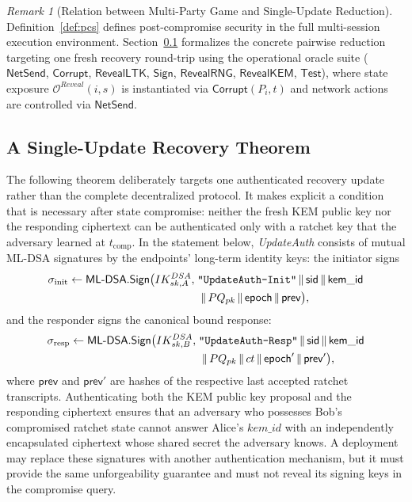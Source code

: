 \documentclass[11pt,a4paper]{article}
\theoremstyle{remark}
\newtheorem{remark}[theorem]{Remark}
\theoremstyle{plain}
\newcommand{\calO}{\mathcal{O}}
\newcommand{\MLDSA}{\mathsf{ML\text{-}DSA}}
\newcommand{\Sign}{\mathsf{Sign}}
\newcommand{\strlit}[1]{\text{\upshape\texttt{"#1"}}}
\begin{document}
\begin{remark}[Relation between Multi-Party Game and Single-Update Reduction]
Definition~\ref{def:pcs} defines post-compromise security in the full multi-session execution environment.  Section~\ref{sec:single-update-theorem} formalizes the concrete pairwise reduction targeting one fresh recovery round-trip using the operational oracle suite ($\mathsf{NetSend}$, $\mathsf{Corrupt}$, $\mathsf{RevealLTK}$, $\mathsf{Sign}$, $\mathsf{RevealRNG}$, $\mathsf{RevealKEM}$, $\mathsf{Test}$), where state exposure $\calO^{Reveal}(i, s)$ is instantiated via $\mathsf{Corrupt}(P_i, t)$ and network actions are controlled via $\mathsf{NetSend}$.
\end{remark}

\subsection{A Single-Update Recovery Theorem}
\label{sec:single-update-theorem}

The following theorem deliberately targets one authenticated recovery update rather than the
complete decentralized protocol.  It makes explicit a condition that is necessary after state
compromise: neither the fresh KEM public key nor the responding ciphertext can be authenticated
only with a ratchet key that the adversary learned at $t_{\mathrm{comp}}$.  In the statement below,
\emph{UpdateAuth} consists of mutual ML-DSA signatures by the endpoints' long-term identity keys:
the initiator signs
\begin{align*}
  \sigma_{\mathrm{init}} \gets \MLDSA.\Sign\bigl(IK^{DSA}_{sk,A},\;
    &\strlit{UpdateAuth-Init} \,\|\, \mathsf{sid} \,\|\, \mathsf{kem\_id} \\
    &\;\|\, PQ_{pk} \,\|\, \mathsf{epoch} \,\|\, \mathsf{prev}\bigr),
\end{align*}
and the responder signs the canonical bound response:
\begin{align*}
  \sigma_{\mathrm{resp}} \gets \MLDSA.\Sign\bigl(IK^{DSA}_{sk,B},\;
    &\strlit{UpdateAuth-Resp} \,\|\, \mathsf{sid} \,\|\, \mathsf{kem\_id} \\
    &\;\|\, PQ_{pk} \,\|\, ct \,\|\, \mathsf{epoch}' \,\|\, \mathsf{prev}'\bigr),
\end{align*}
where $\mathsf{prev}$ and $\mathsf{prev}'$ are hashes of the respective last accepted ratchet
transcripts.  Authenticating both the KEM public key proposal and the responding ciphertext ensures
that an adversary who possesses Bob's compromised ratchet state cannot answer Alice's $kem\_id$ with
an independently encapsulated ciphertext whose shared secret the adversary knows.  A deployment may
replace these signatures with another authentication mechanism, but it must provide the same
unforgeability guarantee and must not reveal its signing keys in the compromise query.
\end{document}
